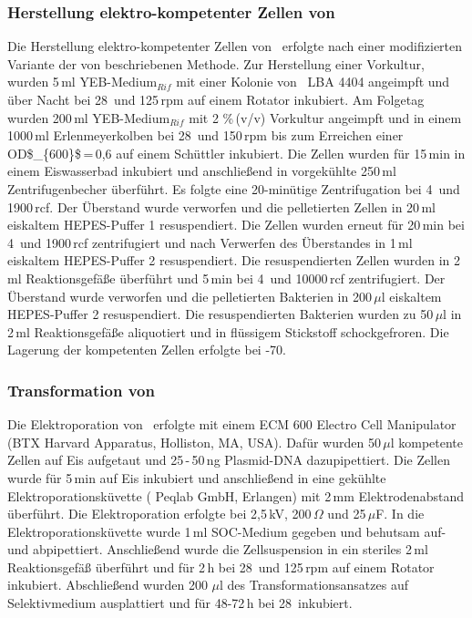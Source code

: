 \subsubsection{Herstellung elektro-kompetenter Zellen von \Atumefaciens}
Die Herstellung elektro-kompetenter Zellen von \Atumefaciens\ erfolgte nach einer modifizierten Variante der von  \citet{Seidman.2001} beschriebenen Methode. 
Zur Herstellung einer Vorkultur, wurden 5\,ml YEB-Medium$_{Rif}$ mit einer Kolonie von \Atumefaciens\ LBA 4404 angeimpft und über Nacht bei 28\celcius\ und 125\,\acs{rpm} auf einem Rotator inkubiert. Am Folgetag wurden 200\,ml YEB-Medium$_{Rif}$ mit 2 \%\,(v/v) Vorkultur angeimpft und in einem 1000\,ml Erlenmeyerkolben bei 28\celcius\, und 150\,\acs{rpm}  bis zum Erreichen einer \acs{OD$_{600}$}\,=\,0,6 auf einem Schüttler inkubiert. Die Zellen wurden für 15\,min in einem Eiswasserbad inkubiert und anschließend in vorgekühlte 250\,ml Zentrifugenbecher überführt. Es folgte eine 20-minütige Zentrifugation bei 4\celcius\ und 1900\,\acs{rcf}. Der Überstand wurde verworfen und die pelletierten Zellen in 20\,ml eiskaltem HEPES-Puffer 1 resuspendiert. Die Zellen wurden erneut für 20\,min bei 4\celcius\ und 1900\,\acs{rcf} zentrifugiert und nach Verwerfen des Überstandes in 1\,ml eiskaltem HEPES-Puffer 2 resuspendiert. Die resuspendierten Zellen wurden in 2\,ml Reaktionsgefäße überführt und 5\,min bei 4\celcius\ und 10000\,\acs{rcf} zentrifugiert. Der Überstand wurde verworfen und die pelletierten Bakterien in 200\,$\mu$l eiskaltem HEPES-Puffer 2 resuspendiert. Die resuspendierten Bakterien wurden zu 50\,$\mu$l in 2\,ml Reaktionsgefäße aliquotiert und in flüssigem Stickstoff schockgefroren. Die Lagerung der kompetenten Zellen erfolgte bei -70\celcius.      
\subsubsection{Transformation von \Atumefaciens}
Die Elektroporation von \Atumefaciens\ erfolgte mit einem ECM 600 Electro Cell Manipulator (BTX Harvard Apparatus, Holliston, MA, USA). Dafür wurden 50\,$\mu$l kompetente Zellen auf Eis aufgetaut und 25\,-\,50\,ng Plasmid-DNA dazupipettiert. Die Zellen wurde für 5\,min auf Eis inkubiert und anschließend in eine gekühlte Elektroporationsküvette ( Peqlab GmbH, Erlangen) mit 2\,mm Elektrodenabstand überführt. Die Elektroporation erfolgte bei 2,5\,kV, 200\,$\Omega$ und 25\,$\mu$F. In die Elektroporationsküvette wurde 1\,ml SOC-Medium gegeben und behutsam auf- und abpipettiert. Anschließend wurde die Zellsuspension in ein steriles 2\,ml Reaktionsgefäß überführt und für 2\,h bei 28\celcius\ und 125\,rpm auf einem Rotator inkubiert. Abschließend wurden 200\,\,$\mu$l des Transformationsansatzes auf Selektivmedium ausplattiert und für 48-72\,h bei 28\celcius\ inkubiert. 
